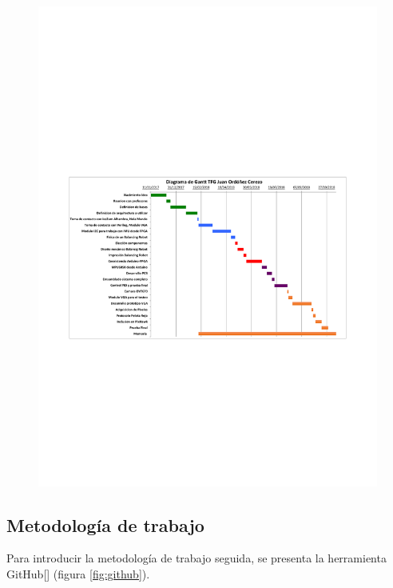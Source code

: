\begin{center}
	\begin{figure}[H]
		\center
		\includegraphics[trim = 15mm 85mm 2cm 100mm,clip, angle=-90, scale = 1]{imagenes/Introduction/Gantt.pdf}
		\label{fig:diagramaGantt}
		\caption{}
	\end{figure}
\end{center}

\subsection{Metodología de trabajo}
Para introducir la metodología de trabajo seguida, se presenta la herramienta GitHub[] (figura \ref{fig:github}).\newline 

